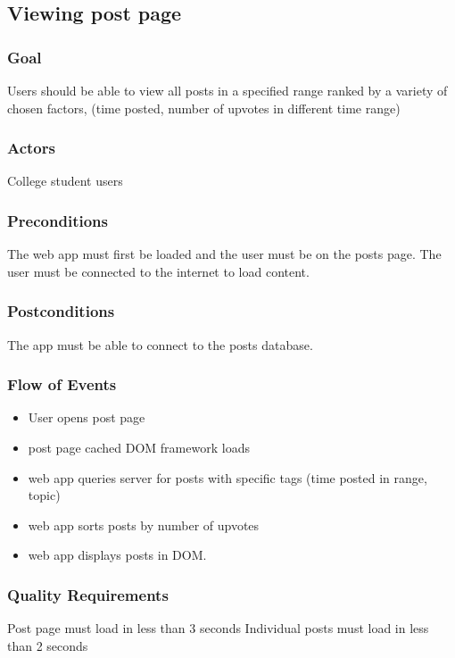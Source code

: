 \documentclass[12pt]{article}
\begin{document}
\subsection{Viewing post page}

  \subsubsection{Goal}
  Users should be able to view all posts in a specified range ranked by a variety of chosen factors, (time posted, number of upvotes in different time range)
  \subsubsection{Actors}
  College student users

  \subsubsection{Preconditions}
  The web app must first be loaded and the user must be on the posts page. The user must be connected to the internet to load content.

  \subsubsection{Postconditions}
  The app must be able to connect to the posts database.

  \subsubsection{Flow of Events}
  \begin{itemize}
    \item User opens post page
    \item post page cached DOM framework loads
    \item web app queries server for posts with specific tags (time posted in range, topic)
    \item web app sorts posts by number of upvotes
    \item web app displays posts in DOM.

  \end{itemize}

  \subsubsection{Quality Requirements}
  Post page must load in less than 3 seconds
  Individual posts must load in less than 2 seconds
\end{document}
